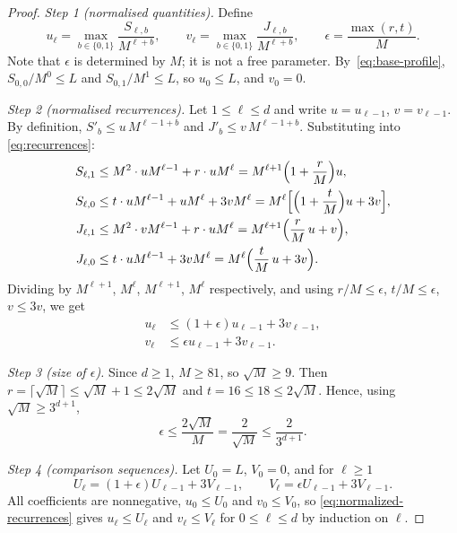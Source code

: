 \documentclass[11pt]{article}
\theoremstyle{definition}
\theoremstyle{remark}
\begin{document}
\begin{proof}
\emph{Step 1 (normalised quantities).} Define
\[
 u_\ell=\max_{b\in\{0,1\}}\frac{S_{\ell,b}}{M^{\ell+b}},
 \qquad
 v_\ell=\max_{b\in\{0,1\}}\frac{J_{\ell,b}}{M^{\ell+b}},
 \qquad
 \epsilon=\frac{\max(r,t)}{M}.
\]
Note that \(\epsilon\) is determined by \(M\); it is not a free parameter.
By~\eqref{eq:base-profile}, \(S_{0,0}/M^0\le L\) and \(S_{0,1}/M^1\le L\), so
\(u_0\leq L\), and \(v_0=0\).

\emph{Step 2 (normalised recurrences).} Let \(1\leq\ell\leq d\) and write
\(u=u_{\ell-1}\), \(v=v_{\ell-1}\). By definition,
\(S'_b\le u\,M^{\ell-1+b}\) and \(J'_b\le v\,M^{\ell-1+b}\). Substituting into
\eqref{eq:recurrences}:
\begin{align*}
 S_{\ell,1}&\le M^2\cdot uM^{\ell-1}+r\cdot uM^{\ell}
   =M^{\ell+1}\Bigl(1+\frac rM\Bigr)u,\\
 S_{\ell,0}&\le t\cdot uM^{\ell-1}+uM^{\ell}+3vM^{\ell}
   =M^{\ell}\Bigl[\Bigl(1+\frac tM\Bigr)u+3v\Bigr],\\
 J_{\ell,1}&\le M^2\cdot vM^{\ell-1}+r\cdot uM^{\ell}
   =M^{\ell+1}\Bigl(\frac rM\,u+v\Bigr),\\
 J_{\ell,0}&\le t\cdot uM^{\ell-1}+3vM^{\ell}
   =M^{\ell}\Bigl(\frac tM\,u+3v\Bigr).
\end{align*}
Dividing by \(M^{\ell+1}\), \(M^\ell\), \(M^{\ell+1}\), \(M^\ell\)
respectively, and using \(r/M\le\epsilon\), \(t/M\le\epsilon\),
\(v\le3v\), we get
\begin{equation}
\label{eq:normalized-recurrences}
 \begin{split}
  u_\ell&\leq (1+\epsilon)u_{\ell-1}+3v_{\ell-1},\\
  v_\ell&\leq \epsilon u_{\ell-1}+3v_{\ell-1}.
 \end{split}
\end{equation}

\emph{Step 3 (size of \(\epsilon\)).} Since \(d\ge1\), \(M\geq81\), so
\(\sqrt M\ge9\). Then \(r=\lceil\sqrt M\rceil\leq\sqrt M+1\le2\sqrt M\) and
\(t=16\leq 18\le 2\sqrt M\). Hence, using \(\sqrt M\ge 3^{d+1}\),
\begin{equation}
\label{eq:epsilon-choice}
 \epsilon\leq\frac{2\sqrt M}{M}=\frac{2}{\sqrt M}\leq\frac{2}{3^{d+1}}.
\end{equation}

\emph{Step 4 (comparison sequences).} Let \(U_0=L\), \(V_0=0\), and for
\(\ell\ge1\)
\[
 U_\ell=(1+\epsilon)U_{\ell-1}+3V_{\ell-1},
 \qquad
 V_\ell=\epsilon U_{\ell-1}+3V_{\ell-1}.
\]
All coefficients are nonnegative, \(u_0\le U_0\) and \(v_0\le V_0\), so
\eqref{eq:normalized-recurrences} gives \(u_\ell\leq U_\ell\) and
\(v_\ell\leq V_\ell\) for \(0\le\ell\le d\) by induction on \(\ell\).


\end{proof}
\end{document}
